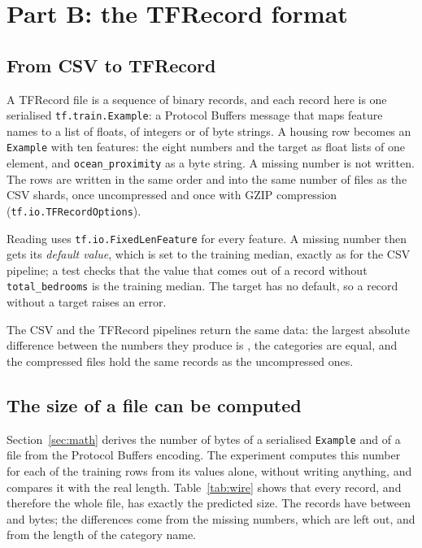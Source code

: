 \section{Part B: the TFRecord format}
\label{sec:tfrecord}

\subsection{From CSV to TFRecord}

A TFRecord file is a sequence of binary records, and each record here is one serialised \texttt{tf.train.Example}: a Protocol Buffers message that maps feature names to a list of floats, of integers or of byte strings. A housing row becomes an \texttt{Example} with ten features: the eight numbers and the target as float lists of one element, and \texttt{ocean\_proximity} as a byte string. A missing number is not written. The rows are written in the same order and into the same number of files as the CSV shards, once uncompressed and once with GZIP compression (\texttt{tf.io.TFRecordOptions}).

Reading uses \texttt{tf.io.FixedLenFeature} for every feature. A missing number then gets its \emph{default value}, which is set to the training median, exactly as for the CSV pipeline; a test checks that the value that comes out of a record without \texttt{total\_bedrooms} is the training median. The target has no default, so a record without a target raises an error.

The CSV and the TFRecord pipelines return the same data: the largest absolute difference between the numbers they produce is , the categories are equal, and the compressed files hold the same records as the uncompressed ones.

\subsection{The size of a file can be computed}

Section~\ref{sec:math} derives the number of bytes of a serialised \texttt{Example} and of a file from the Protocol Buffers encoding. The experiment computes this number for each of the  training rows from its values alone, without writing anything, and compares it with the real length. Table~\ref{tab:wire} shows that every record, and therefore the whole file, has exactly the predicted size. The records have between  and  bytes; the differences come from the missing numbers, which are left out, and from the length of the category name.

